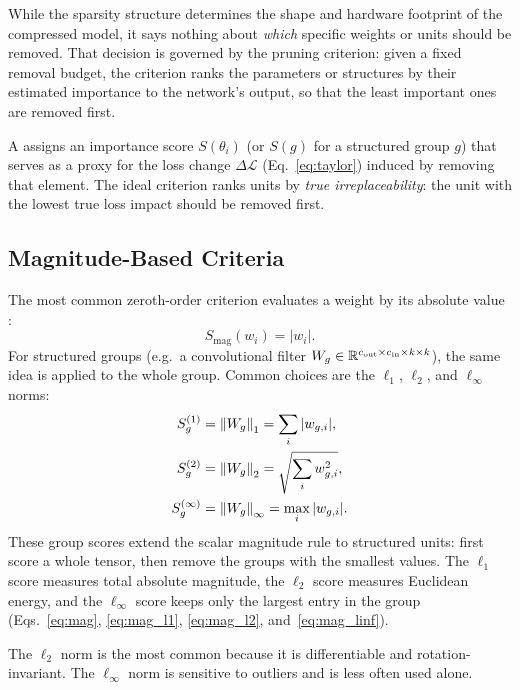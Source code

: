 While the sparsity structure determines the shape and hardware footprint of the compressed model, it says nothing about \emph{which} specific weights or units should be removed. That decision is governed by the pruning criterion: given a fixed removal budget, the criterion ranks the parameters or structures by their
estimated importance to the network's output, so that the least important ones are removed first.


A  assigns an importance score $S(\theta_i)$ (or $S(g)$ for a structured group $g$) that serves as a proxy for the loss change $\Delta\mathcal{L}$ (Eq.~\eqref{eq:taylor}) induced by removing that element.  The ideal criterion
ranks units by \emph{true irreplaceability}: the unit with the lowest true loss impact should be removed first.

\subsection{Magnitude-Based Criteria}
\label{subsec:magnitude_based_criteria}

The most common zeroth-order criterion evaluates a weight by its absolute value \cite{han2015learning}:
\begin{equation}
	S_{\mathrm{mag}}(w_i) = |w_i|.
	\label{eq:mag}
\end{equation}
For structured groups (e.g.\ a convolutional filter
$W_g \in \mathbb{R}^{c_\mathrm{out} \times c_\mathrm{in} \times k \times k}$), the
same idea is applied to the whole group. Common choices are the $\ell_1$, $\ell_2$, and $\ell_\infty$ norms:
\begin{align}
	S_g^{(1)} &= \left\lVert W_g \right\rVert_1 = \sum_{i} |w_{g,i}|, \label{eq:mag_l1} \\
	S_g^{(2)} &= \left\lVert W_g \right\rVert_2 = \sqrt{\sum_{i} w_{g,i}^2}, \label{eq:mag_l2} \\
	S_g^{(\infty)} &= \left\lVert W_g \right\rVert_\infty = \max_i |w_{g,i}|. \label{eq:mag_linf}
\end{align}
These group scores extend the scalar magnitude rule to structured units: first score a whole tensor, then remove the groups with the smallest values. The $\ell_1$ score measures total absolute magnitude, the $\ell_2$ score measures Euclidean energy, and the $\ell_\infty$ score keeps only the largest entry in the group (Eqs.~\eqref{eq:mag}, \eqref{eq:mag_l1}, \eqref{eq:mag_l2}, and~\eqref{eq:mag_linf}).

The $\ell_2$ norm is the most common because it is differentiable and
rotation-invariant.  The $\ell_\infty$ norm is sensitive to outliers and
is less often used alone.

